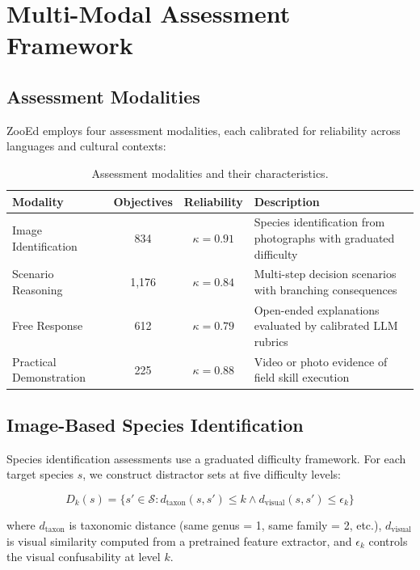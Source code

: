 \section{Multi-Modal Assessment Framework}

\label{sec:assessment}

\subsection{Assessment Modalities}

ZooEd employs four assessment modalities, each calibrated for reliability across languages and cultural contexts:

\begin{table}[H]
\centering
\caption{Assessment modalities and their characteristics.}
\label{tab:assessment_modalities}
\begin{tabularx}{\textwidth}{@{}lccX@{}}
\toprule
\textbf{Modality} & \textbf{Objectives} & \textbf{Reliability} & \textbf{Description} \\
\midrule
Image Identification & 834 & $\kappa = 0.91$ & Species identification from photographs with graduated difficulty \\
Scenario Reasoning & 1,176 & $\kappa = 0.84$ & Multi-step decision scenarios with branching consequences \\
Free Response & 612 & $\kappa = 0.79$ & Open-ended explanations evaluated by calibrated LLM rubrics \\
Practical Demonstration & 225 & $\kappa = 0.88$ & Video or photo evidence of field skill execution \\
\bottomrule
\end{tabularx}
\end{table}

\subsection{Image-Based Species Identification}

Species identification assessments use a graduated difficulty framework.
For each target species $s$, we construct distractor sets at five difficulty levels:

\begin{equation}
    D_k(s) = \{s' \in \mathcal{S} : d_{\text{taxon}}(s, s') \leq k \wedge d_{\text{visual}}(s, s') \leq \epsilon_k\}
\end{equation}

\noindent where $d_{\text{taxon}}$ is taxonomic distance (same genus = 1, same family = 2, etc.), $d_{\text{visual}}$ is visual similarity computed from a pretrained feature extractor, and $\epsilon_k$ controls the visual confusability at level $k$.

